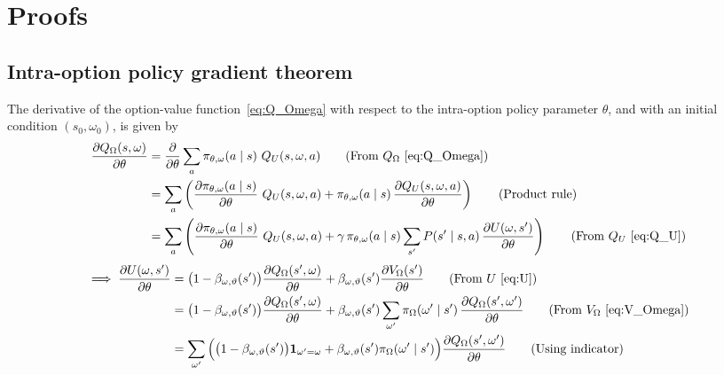 \section*{Proofs}

\subsection*{Intra-option policy gradient theorem~\cite{bacon2017option}}

The derivative of the option-value function~\eqref{eq:Q_Omega} with respect to the intra-option policy parameter \( \theta \), and with an initial condition \( (s_0, \omega_0) \), is given by
\begin{align}
    \frac{\partial Q_\Omega(s, \omega)}{\partial \theta}
     & =
    \frac{\partial}{\partial \theta} \sum_{a} \pi_{\theta, \omega}(a \mid s) \ Q_U(s, \omega, a)
    \tag{From \( Q_\Omega \)~\eqref{eq:Q_Omega}}
    \\ & =
    \sum_{a} \left( \frac{\partial \pi_{\theta, \omega}(a \mid s)}{\partial \theta}  \ Q_U(s, \omega, a) + \pi_{\theta, \omega}(a \mid s) \, \frac{\partial Q_U(s, \omega, a)}{\partial \theta} \right)
    \tag{Product rule}
    \\ & =
    \sum_{a} \left( \frac{\partial \pi_{\theta, \omega}(a \mid s)}{\partial \theta}  \ Q_U(s, \omega, a) + \gamma \, \pi_{\theta, \omega}(a \mid s) \sum_{s'} P(s' \mid s, a) \, \frac{\partial U(\omega, s')}{\partial \theta} \right)
    \tag{From \( Q_U \)~\eqref{eq:Q_U}}
\end{align}
\begin{align}
    \implies
    \frac{\partial U(\omega, s')}{\partial \theta}
     & =
    \big( 1 - \beta_{\omega, \vartheta}(s') \big) \frac{\partial Q_\Omega(s', \omega)}{\partial \theta} + \beta_{\omega, \vartheta}(s') \frac{\partial V_\Omega(s')}{\partial \theta}
    \tag{From \( U \)~\eqref{eq:U}}
    \\ & =
    \big( 1 - \beta_{\omega, \vartheta}(s') \big) \frac{\partial Q_\Omega(s', \omega)}{\partial \theta} + \beta_{\omega, \vartheta}(s') \sum_{\omega'} \pi_\Omega(\omega' \mid s') \, \frac{\partial Q_\Omega(s', \omega')}{\partial \theta}
    \tag{From \( V_\Omega \)~\eqref{eq:V_Omega}}
    \\ & =
    \sum_{\omega'} \Big( \big( 1 - \beta_{\omega, \vartheta}(s') \big) \mathbf{1}_{\omega' = \omega} + \beta_{\omega, \vartheta}(s') \pi_\Omega(\omega' \mid s') \Big) \frac{\partial Q_\Omega(s', \omega')}{\partial \theta}
    \tag{Using indicator}
\end{align}
